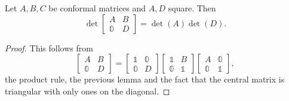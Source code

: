 \begin{lemma}
Let $A,B,C$ be conformal matrices and $A,D$ square. Then
\[ \det\begin{bmatrix}A & B \\ \mathbb{0} & D \end{bmatrix} = \det(A)\det(D). \]
\end{lemma}
\begin{proof}
This follows from
\[ \begin{bmatrix}A & B \\ \mathbb{0} & D \end{bmatrix} = \begin{bmatrix}\mathbb{1} & \mathbb{0} \\ \mathbb{0} & D \end{bmatrix} \begin{bmatrix}\mathbb{1} & B \\ \mathbb{0} & \mathbb{1} \end{bmatrix} \begin{bmatrix}A & \mathbb{0} \\ \mathbb{0} & \mathbb{1} \end{bmatrix}, \]
the product rule, the previous lemma and the fact that the central matrix is triangular with only ones on the diagonal.
\end{proof}

